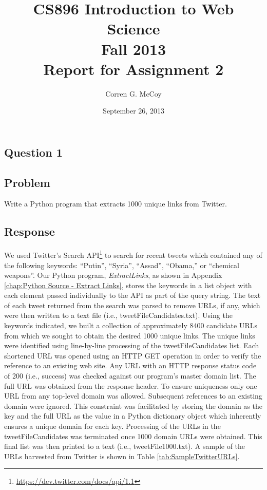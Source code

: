 \documentclass[letterpaper,11pt]{report}
\begin{document}
 
\begin{savenotes}
\pagestyle{plain}
\title{CS896 Introduction to Web Science\\Fall 2013\\Report for Assignment 2}
\author{Corren G. McCoy}
 
\date{September 26, 2013}
\maketitle

\renewcommand*\thesection{\arabic{section}}
\setcounter{section}{0}

\setcounter{tocdepth}{4}
\tableofcontents
 \listoffigures
 \listoftables
\newpage


\section{Question 1}
\subsection{Problem}Write a Python program that extracts 1000 unique links from Twitter.
\subsection{Response}We used Twitter's Search API\footnote{\url{https://dev.twitter.com/docs/api/1.1}} to search for recent tweets which contained any of the following keywords: ``Putin'', ``Syria'', ``Assad'', ``Obama,'' or ``chemical weapons''. Our Python program, \emph{ExtractLinks}, as shown in Appendix \ref{chap:Python Source - Extract Links}, stores the keywords in a list object with each element passed individually to the API as part of the query string. The text of each tweet returned from the search was parsed to remove URLs, if any, which were then written to a text file (i.e., tweetFileCandidates.txt). Using the keywords indicated, we built a collection of approximately 8400 candidate URLs from which we sought to obtain the desired 1000 unique links. The unique links were identified using line-by-line processing of the tweetFileCandidates list. Each shortened URL was opened using an HTTP GET operation in order to verify the reference to an existing web site. Any URL with an HTTP response status code of 200 (i.e., success) was checked against our program's master domain list. The full URL was obtained from the response header. To ensure uniqueness only one URL from any top-level domain was allowed. Subsequent references to an existing domain were ignored. This constraint was facilitated by storing the domain as the key and the full URL as the value in a Python dictionary object which inherently ensures a unique domain for each key. Processing of the URLs in the tweetFileCandidates was terminated once 1000 domain URLs were obtained. This final list was then printed to a text (i.e., tweetFile1000.txt). A sample of the URLs harvested from Twitter is shown in Table \ref{tab:SampleTwitterURLs}.


\end{savenotes}
\end{document}
